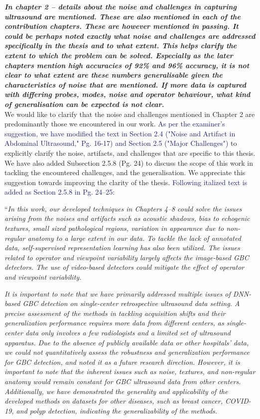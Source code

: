 \documentclass[11pt,times]{article}
\newcommand{\rev}[1]{\textcolor{MidnightBlue}{#1}}
\newcommand{\myfirstpara}[1]{\noindent \textbf{\textit{#1}}}
\newcommand{\mypara}[1]{\vspace{0.75em} \myfirstpara{#1}\\}
\begin{document}
{\mypara{In chapter 2 -- details about the noise and challenges in capturing ultrasound are mentioned. These are also mentioned in each of the contribution chapters. These are however mentioned in passing. It could be perhaps noted exactly what noise and challenges are addressed specifically in the thesis and to what extent. This helps clarify the extent to which the problem can be solved. Especially as the later chapters mention high accuracies of 92\% and 96\% accuracy, it is not clear to what extent are these numbers generalisable given the characteristics of noise that are mentioned. If more data is captured with differing probes, modes, noise and operator behaviour, what kind of generalisation can be expected is not clear.}
%
We would like to clarify that the noise and challenges mentioned in Chapter 2 are predominantly those we encountered in our work. \rev{As per the examiner's suggestion, we have modified the text in Section 2.4 ("Noise and Artifact in Abdominal Ultrasound," Pg. 16-17) and Section 2.5 ("Major Challenges")} to explicitly clarify the noise, artifacts, and challenges that are specific to this thesis. We have also added Subsection 2.5.8 (Pg. 24) to discuss the scope of this work in tackling the encountered challenges, and the generalisation.
We appreciate this suggestion towards improving the clarity of the thesis. \rev{Following italized text is added as Section 2.5.8 in Pg. 24--25}:

\vspace{0.5em}
``\textit{In this work, our developed techniques in Chapters 4--8 could solve the issues arising from the noises and artifacts such as acoustic shadows, bias to echogenic textures, small sized pathological regions, variation in appearance due to non-regular anatomy to a large extent in our data. To tackle the lack of annotated data, self-supervised representation learning has also been utilized. The issues related to operator and viewpoint variability largely affects the image-based GBC detectors. The use of video-based detectors could mitigate the effect of operator and viewpoint variability.}

\textit{It is important to note that we have primarily addressed multiple issues of DNN-based GBC detection on single-center retrospective ultrasound data setting. A precise assessment of the methods in tackling acquisition shifts and their generalization performance requires more data from different centers, as single-center data only involves a few radiologists and a limited set of ultrasound apparatus. Due to the absence of publicly available data or other hospitals' data, we could not quantitatively assess the robustness and generalization performance for GBC detection, and noted it as a future research direction. However, it is important to note that the inherent issues such as noise, textures, and non-regular anatomy would remain constant for GBC ultrasound data from other centers. Additionally, we have demonstrated the generality and applicability of the developed methods on datasets for other diseases, such as breast cancer, COVID-19, and polyp detection, indicating the generalizability of the methods.}

}
\end{document}
